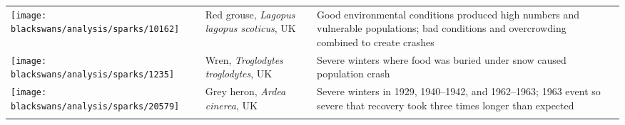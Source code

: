 {\begin{small}
\begin{longtable}{>{\RaggedRight}m{2.0cm}>{\RaggedRight}p{3.0cm}>{\RaggedRight}p{7.0cm}>{\RaggedRight}p{2.0cm}}
\texttt{[image: blackswans/analysis/sparks/10162]} &
Red grouse,
\textit{Lagopus lagopus scoticus},
UK &
Good environmental conditions produced high numbers and vulnerable populations;
bad conditions and overcrowding combined to create crashes  &
\citep{mackenzie1952}\\

\texttt{[image: blackswans/analysis/sparks/1235]} &
Wren,
\textit{Troglodytes troglodytes},
UK &
Severe winters where food was buried under snow caused population crash &
\citep{newton1998} \\

\texttt{[image: blackswans/analysis/sparks/20579]} &
Grey heron,
\textit{Ardea cinerea},
UK &
Severe winters in 1929, 1940--1942, and 1962--1963; 1963 event so severe that
recovery took three times longer than expected &
\citep{stafford1971} \\





\bottomrule
\label{tab:sparks}
\end{longtable}
\end{small}


\renewcommand{\baselinestretch}{\textstretch} %
}
